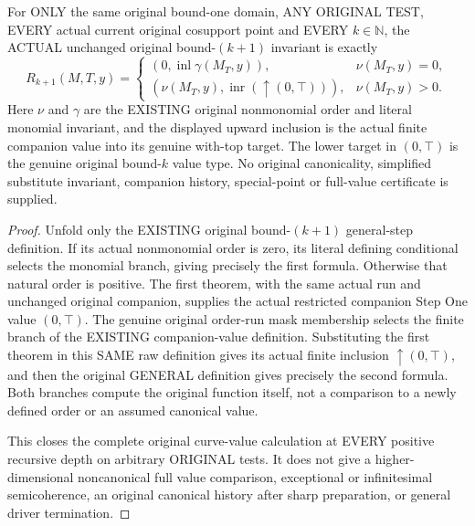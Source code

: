 \begin{theorem}
\label{hir:original-any-test-curve-entire-full-invariant-formula}
\leanok
For ONLY the same original bound-one domain, ANY ORIGINAL TEST, EVERY
actual current original cosupport point and EVERY $k\in\mathbb N$, the
ACTUAL unchanged original bound-$(k+1)$ invariant is exactly
\[
 R_{k+1}(M,T,y)=
 \begin{cases}
   (0,\operatorname{inl}\gamma(M_T,y)),&\nu(M_T,y)=0,\\
   (\nu(M_T,y),\operatorname{inr}(\uparrow(0,\top))),&\nu(M_T,y)>0.
 \end{cases}
\]
Here $\nu$ and $\gamma$ are the EXISTING original nonmonomial order and
literal monomial invariant, and the displayed upward inclusion is the
actual finite companion value into its genuine with-top target.
The lower target in $(0,\top)$ is the genuine original bound-$k$ value
type. No original canonicality, simplified substitute invariant, companion
history, special-point or full-value certificate is supplied.
\end{theorem}
\begin{proof}
Unfold only the EXISTING original bound-$(k+1)$ general-step definition.
If its actual nonmonomial order is zero, its literal defining conditional
selects the monomial branch, giving precisely the first formula.
Otherwise that natural order is positive. The first theorem, with the
same actual run and unchanged original companion, supplies the actual
restricted companion Step One value $(0,\top)$. The genuine original
order-run mask membership selects the finite branch of the EXISTING
companion-value definition. Substituting the first theorem in this SAME
raw definition gives its actual finite inclusion $\uparrow(0,\top)$,
and then the original GENERAL definition gives precisely the second
formula. Both branches compute the original function itself, not a
comparison to a newly defined order or an assumed canonical value.

This closes the complete original curve-value calculation at EVERY
positive recursive depth on arbitrary ORIGINAL tests. It does not give a higher-dimensional noncanonical full
value comparison, exceptional or infinitesimal semicoherence, an original
canonical history after sharp preparation, or general driver termination.
\end{proof}
